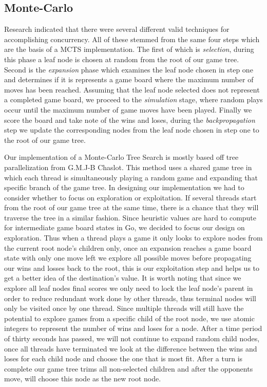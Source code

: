 \documentclass[conference]{IEEEtran}
\begin{document}
\subsection{Monte-Carlo}
Research indicated that there were several different valid techniques for accomplishing concurrency. All of these stemmed from the same four steps which are the basis of a MCTS implementation. The first of which is \textit{selection}, during this phase a leaf node is chosen at random from the root of our game tree. Second is the \textit{expansion} phase which examines the leaf node chosen in step one and determines if it is represents a game board where the maximum number of moves has been reached. Assuming that the leaf node selected does not represent a completed game board, we proceed to the \textit{simulation} stage, where random plays occur until the maximum number of game moves have been played. Finally we score the board and take note of the wins and loses, during the \textit{backpropagation} step we update the corresponding nodes from the leaf node chosen in step one to the root of our game tree.\par
Our implementation of a Monte-Carlo Tree Search is mostly based off tree parallelization from G.M.J-B Chaslot. This method uses a shared game tree in which each thread is simultaneously playing a random game and expanding that specific branch of the game tree. In designing our implementation we had to consider whether to focus on exploration or exploitation.  If several threads start from the root of our game tree at the same time, there is a chance that they will traverse the tree in a similar fashion. Since heuristic values are hard to compute for intermediate game board states in Go, we decided to focus our design on exploration. Thus when a thread plays a game it only looks to explore nodes from the current root node's children only, once an expansion reaches a game board state with only one move left we explore all possible moves before propagating our wins and losses back to the root, this is our exploitation step and helps us to get a better idea of the destination's value. It is worth noting that since we explore all leaf nodes final scores we only need to lock the leaf node's parent in order to reduce redundant work done by other threads, thus terminal nodes will only be visited once by one thread. Since multiple threads will still have the potential to explore games from a specific child of the root node, we use atomic integers to represent the number of wins and loses for a node. After a time period of thirty seconds has passed, we will not continue to expand random child nodes, once all threads have terminated we look at the difference between the wins and loses for each child node and choose the one that is most fit. After a turn is complete our game tree trims all non-selected children and after the opponents move, will choose this node as the new root node.
\end{document}
